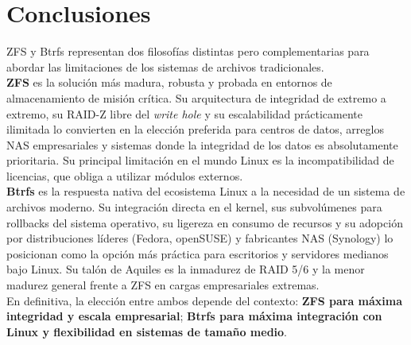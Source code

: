 \documentclass[12pt,letterpaper]{article}
\begin{document}
\newpage

\section{Conclusiones}

ZFS y Btrfs representan dos filosofías distintas pero complementarias para abordar las limitaciones de los
sistemas de archivos tradicionales.\\

\textbf{ZFS} es la solución más madura, robusta y probada en entornos de almacenamiento de misión crítica. Su
arquitectura de integridad de extremo a extremo, su RAID-Z libre del \emph{write hole} y su escalabilidad
prácticamente ilimitada lo convierten en la elección preferida para centros de datos, arreglos NAS empresariales
y sistemas donde la integridad de los datos es absolutamente prioritaria. Su principal limitación en el mundo
Linux es la incompatibilidad de licencias, que obliga a utilizar módulos externos.\\

\textbf{Btrfs} es la respuesta nativa del ecosistema Linux a la necesidad de un sistema de archivos moderno. Su
integración directa en el kernel, sus subvolúmenes para rollbacks del sistema operativo, su ligereza en consumo
de recursos y su adopción por distribuciones líderes (Fedora, openSUSE) y fabricantes NAS (Synology) lo
posicionan como la opción más práctica para escritorios y servidores medianos bajo Linux. Su talón de Aquiles es
la inmadurez de RAID 5/6 y la menor madurez general frente a ZFS en cargas empresariales extremas.\\

En definitiva, la elección entre ambos depende del contexto:
\textbf{ZFS para máxima integridad y escala empresarial};
\textbf{Btrfs para máxima integración con Linux y flexibilidad en sistemas de tamaño medio}.
\end{document}
